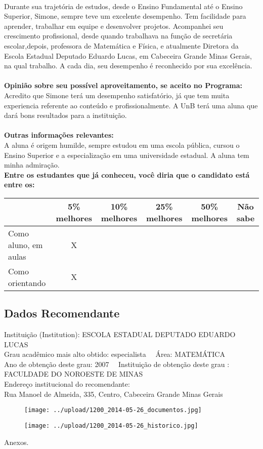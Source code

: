 \documentclass[11pt]{article}
\begin{document}
\\Durante sua trajetória de estudos, desde o Ensino Fundamental até o Ensino Superior, Simone, sempre teve um excelente desempenho. Tem facilidade para aprender, trabalhar em equipe e desenvolver projetos. Acompanhei seu crescimento profissional, desde quando trabalhava na função de secretária escolar,depois, professora de Matemática e Física, e atualmente Diretora da Escola Estadual Deputado Eduardo Lucas, em Cabeceira Grande Minas Gerais,   na qual trabalho. A cada dia, seu desempenho é reconhecido por sua excelência.\\
\\
\textbf{Opinião sobre seu possível aproveitamento, se aceito no Programa:}
\\Acredito que Simone terá um desempenho satisfatório, já que tem muita experiencia referente ao conteúdo e profissionalmente. A UnB terá uma aluna que dará bons resultados para a instituição. \\ 
\\
\textbf{Outras informações relevantes:} \\A aluna é origem humilde, sempre estudou em uma escola pública, cursou o Ensino Superior e a especialização em uma universidade estadual. 
A aluna tem minha admiração. 
\\[0.3cm]
\textbf{Entre os estudantes que já conheceu, você diria que o candidato está entre os:}
\\
\begin{tabular}{|l|c|c|c|c|c|}
\hline
 & 5\% melhores & 10\% melhores & 25\% melhores & 50\% melhores & Não sabe \\
\hline
Como aluno, em aulas & X &  &  &  & \\
\hline
Como orientando & X &  &  &  & \\
\hline
\end{tabular}
\subsection*{Dados Recomendante} 
	Instituição (Institution): ESCOLA ESTADUAL DEPUTADO EDUARDO LUCAS
\\ 
	Grau acadêmico mais alto obtido: especialista
	\ \ Área: MATEMÁTICA
	\\
	Ano de obtenção deste grau: 2007
	\ \ 
	Instituição de obtenção deste grau : FACULDADE DO NOROESTE DE MINAS 
	\\ 
	Endereço institucional do recomendante: \\ Rua Manoel de Almeida, 335, Centro, Cabeceira Grande  Minas Gerais	
\begin{figure}[!htb]
\texttt{[image: ../upload/1200\_2014-05-26\_documentos.jpg]}
\end{figure}	
\begin{figure}[!htb]
\texttt{[image: ../upload/1200\_2014-05-26\_historico.jpg]}
\end{figure} 
\begin{center}
Anexos.
\end{center}
\end{document}
